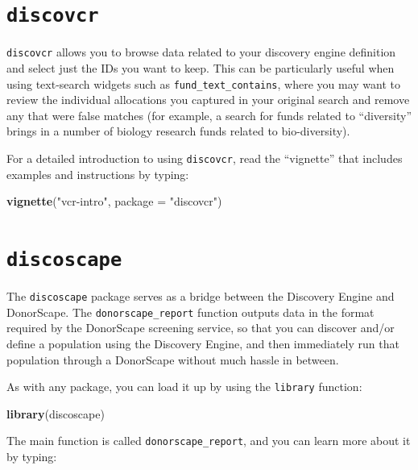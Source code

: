 \documentclass[]{book}
\newenvironment{Shaded}{\begin{snugshade}}{\end{snugshade}}
\newcommand{\DataTypeTok}[1]{\textcolor[rgb]{0.13,0.29,0.53}{#1}}
\newcommand{\KeywordTok}[1]{\textcolor[rgb]{0.13,0.29,0.53}{\textbf{#1}}}
\newcommand{\NormalTok}[1]{#1}
\newcommand{\StringTok}[1]{\textcolor[rgb]{0.31,0.60,0.02}{#1}}
\begin{document}
\hypertarget{discovcr}{%
\section{\texorpdfstring{\texttt{discovcr}}{discovcr}}\label{discovcr}}

\texttt{discovcr} allows you to browse data related to your discovery engine definition and select just the IDs you want to keep. This can be particularly useful when using text-search widgets such as \texttt{fund\_text\_contains}, where you may want to review the individual allocations you captured in your original search and remove any that were false matches (for example, a search for funds related to ``diversity'' brings in a number of biology research funds related to bio-diversity).

For a detailed introduction to using \texttt{discovcr}, read the ``vignette'' that includes examples and instructions by typing:

\begin{Shaded}
\begin{Highlighting}[]
\KeywordTok{vignette}\NormalTok{(}\StringTok{"vcr-intro"}\NormalTok{, }\DataTypeTok{package =} \StringTok{"discovcr"}\NormalTok{)}
\end{Highlighting}
\end{Shaded}

\hypertarget{discoscape}{%
\section{\texorpdfstring{\texttt{discoscape}}{discoscape}}\label{discoscape}}

The \texttt{discoscape} package serves as a bridge between the Discovery Engine and DonorScape. The \texttt{donorscape\_report} function outputs data in the format required by the DonorScape screening service, so that you can discover and/or define a population using the Discovery Engine, and then immediately run that population through a DonorScape without much hassle in between.

As with any package, you can load it up by using the \texttt{library} function:

\begin{Shaded}
\begin{Highlighting}[]
\KeywordTok{library}\NormalTok{(discoscape)}
\end{Highlighting}
\end{Shaded}

The main function is called \texttt{donorscape\_report}, and you can learn more about it by typing:
\end{document}
